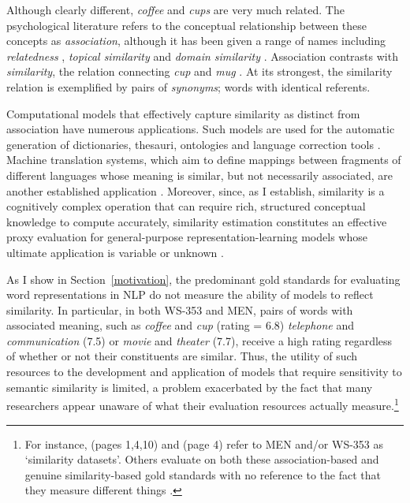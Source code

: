 Although clearly different, \emph{coffee} and \emph{cups} are very much related. The psychological literature refers to the conceptual relationship between these concepts as \emph{association}, although it has been given a range of names including \emph{relatedness} \cite{budanitsky2006evaluating,agirre2009study}, \emph{topical similarity} \cite{hatzivassiloglou2001simfinder} and \emph{domain similarity} \cite{turney2012domain}. Association contrasts with \emph{similarity}, the relation connecting \emph{cup} and \emph{mug} \cite{tversky1977features}. At its strongest, the similarity relation is exemplified by pairs of \emph{synonyms}; words with identical referents.

Computational models that effectively capture similarity as distinct from association have numerous applications. Such models are used for the automatic generation of dictionaries, thesauri, ontologies and language correction tools \cite{cimiano2005learning,biemann2005ontology,li2006exploring}. Machine translation systems, which aim to define mappings between fragments of different languages whose meaning is similar, but not necessarily associated, are another established application \cite{he2008indirect,marton2009improved}. Moreover, since, as I establish, similarity is a cognitively complex operation that can require rich, structured conceptual knowledge to compute accurately, similarity estimation constitutes an effective proxy evaluation for general-purpose representation-learning models whose ultimate application is variable or unknown \cite{collobert2008unified,baroni2010distributional}.

As I show in Section~\ref{motivation}, the predominant gold standards for evaluating word representations in NLP do not measure the ability of models to reflect similarity. In particular, in both WS-353 and MEN, pairs of words with associated meaning, such as \emph{coffee} and \emph{cup} (rating = 6.8) \emph{telephone} and \emph{communication} (7.5) or \emph{movie} and \emph{theater} (7.7), receive a high rating regardless of whether or not their constituents are similar. Thus, the utility of such resources to the development and application of models that require sensitivity to semantic similarity is limited, a problem exacerbated by the fact that many researchers appear unaware of what their evaluation resources actually measure.\footnote{For instance,  \cite{huang2012improving} (pages 1,4,10) and \cite{reisinger2010multi} (page 4) refer to MEN and/or WS-353 as `similarity datasets'. Others evaluate on both these association-based and genuine similarity-based gold standards with no reference to the fact that they measure different things \cite{medelyan2009mining,li2014obtaining}.} 

